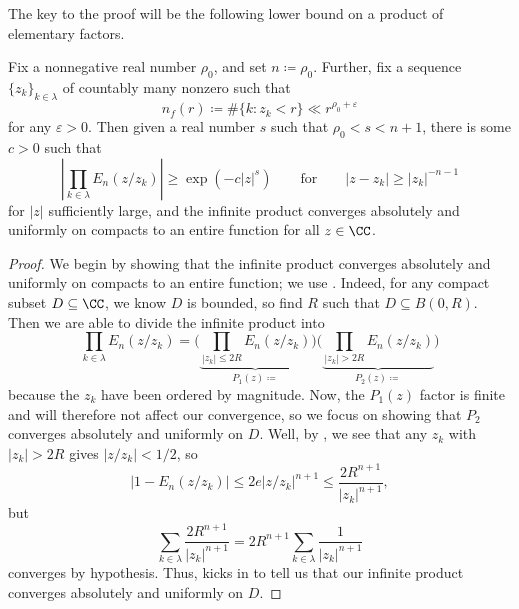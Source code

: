 \documentclass[notes.tex]{subfiles}
\begin{document}
The key to the proof will be the following lower bound on a product of elementary factors.
\begin{lemma} \label{lem:elem-factor-prod-lower-bound}
	Fix a nonnegative real number $\rho_0$, and set $n\coloneqq{\rho_0}$. Further, fix a sequence $\{z_k\}_{k\in\lambda}$ of countably many nonzero such that
	\[n_f(r)\coloneqq\#\{k:z_k<r\}\ll r^{\rho_0+\varepsilon}\]
	for any $\varepsilon>0$. Then given a real number $s$ such that $\rho_0<s<n+1$, there is some $c>0$ such that
	\[\left|\prod_{k\in\lambda}E_n(z/z_k)\right|\ge\exp\left(-c|z|^s\right)\qquad\text{for}\qquad|z-z_k|\ge|z_k|^{-n-1}\]
	for $|z|$ sufficiently large, and the infinite product converges absolutely and uniformly on compacts to an entire function for all $z\in\CC$.
\end{lemma}
\begin{proof}
	We begin by showing that the infinite product converges absolutely and uniformly on compacts to an entire function; we use . Indeed, for any compact subset $D\subseteq\CC$, we know $D$ is bounded, so find $R$ such that $D\subseteq B(0,R)$. Then we are able to divide the infinite product into
	\[\prod_{k\in\lambda} E_n(z/z_k)=\Bigg(\underbrace{\prod_{|z_k|\le2R}E_n(z/z_k)}_{P_1(z)\coloneqq}\Bigg)\Bigg(\underbrace{\prod_{|z_k|>2R}E_n(z/z_k)}_{P_2(z)\coloneqq}\Bigg)\]
	because the $z_k$ have been ordered by magnitude. Now, the $P_1(z)$ factor is finite and will therefore not affect our convergence, so we focus on showing that $P_2$ converges absolutely and uniformly on $D$. Well, by , we see that any $z_k$ with $|z_k|>2R$ gives $|z/z_k|<1/2$, so
	\[|1-E_n(z/z_k)|\le2e|z/z_k|^{n+1}\le\frac{2R^{n+1}}{|z_k|^{n+1}},\]
	but
	\[\sum_{k\in\lambda}\frac{2R^{n+1}}{|z_k|^{n+1}}=2R^{n+1}\sum_{k\in\lambda}\frac1{|z_k|^{n+1}}\]
	converges by hypothesis. Thus,  kicks in to tell us that our infinite product converges absolutely and uniformly on $D$.


\end{proof}
\end{document}
